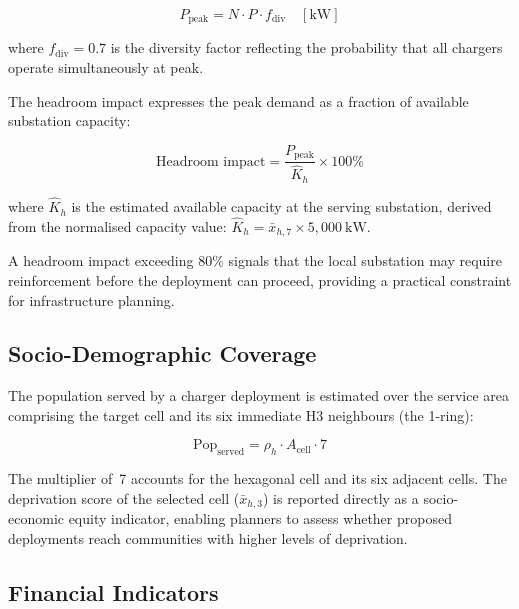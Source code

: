 \begin{equation}
\label{eq:peak}
P_{\text{peak}} = N \cdot P \cdot f_{\text{div}}
\quad [\text{kW}]
\end{equation}

\noindent where $f_{\text{div}} = 0.7$ is the diversity factor reflecting the probability that all chargers operate simultaneously at peak.

The headroom impact expresses the peak demand as a fraction of available substation capacity:

\begin{equation}
\label{eq:headroom}
\text{Headroom impact} = \frac{P_{\text{peak}}}{\hat{K}_h} \times 100\%
\end{equation}

\noindent where $\hat{K}_h$ is the estimated available capacity at the serving substation, derived from the normalised capacity value: $\hat{K}_h = \bar{x}_{h,7} \times 5{,}000~\text{kW}$.

A headroom impact exceeding $80\%$ signals that the local substation may require reinforcement before the deployment can proceed, providing a practical constraint for infrastructure planning.

\subsection{Socio-Demographic Coverage}
\label{sec:socio}

The population served by a charger deployment is estimated over the service area comprising the target cell and its six immediate H3 neighbours (the 1-ring):

\begin{equation}
\label{eq:pop-served}
\text{Pop}_{\text{served}} = \rho_h \cdot A_{\text{cell}} \cdot 7
\end{equation}

\noindent The multiplier of~7 accounts for the hexagonal cell and its six adjacent cells. The deprivation score of the selected cell ($\bar{x}_{h,3}$) is reported directly as a socio-economic equity indicator, enabling planners to assess whether proposed deployments reach communities with higher levels of deprivation.

\subsection{Financial Indicators}
\label{sec:financial}

